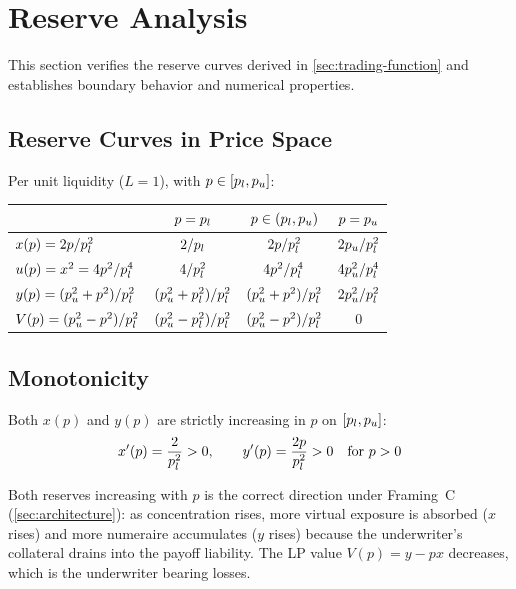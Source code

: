 
\section{Reserve Analysis}\label{sec:reserves}

This section verifies the reserve curves derived in \cref{sec:trading-function}
and establishes boundary behavior and numerical properties.

\subsection{Reserve Curves in Price Space}

Per unit liquidity ($L = 1$), with $p \in [p_l, p_u]$:

\begin{center}
\begin{tabular}{@{}lccc@{}}
\toprule
& $p = p_l$ & $p \in (p_l, p_u)$ & $p = p_u$ \\
\midrule
$x(p) = 2p/p_l^2$ & $2/p_l$ & $2p/p_l^2$ & $2p_u/p_l^2$ \\
$u(p) = x^2 = 4p^2/p_l^4$ & $4/p_l^2$ & $4p^2/p_l^4$ & $4p_u^2/p_l^4$ \\
$y(p) = (p_u^2+p^2)/p_l^2$ & $(p_u^2+p_l^2)/p_l^2$ & $(p_u^2+p^2)/p_l^2$ & $2p_u^2/p_l^2$ \\
$V(p) = (p_u^2-p^2)/p_l^2$ & $(p_u^2-p_l^2)/p_l^2$ & $(p_u^2-p^2)/p_l^2$ & $0$ \\
\bottomrule
\end{tabular}
\end{center}

\subsection{Monotonicity}

\begin{proposition}\label{prop:reserve-monotone}
Both $x(p)$ and $y(p)$ are strictly increasing in $p$ on $[p_l, p_u]$:
\[
  x'(p) = \frac{2}{p_l^2} > 0, \qquad
  y'(p) = \frac{2p}{p_l^2} > 0 \quad\text{for } p > 0
\]
\end{proposition}

\begin{remark}
Both reserves increasing with $p$ is the correct direction under Framing~C
(\cref{sec:architecture}): as concentration rises, more virtual exposure
is absorbed ($x$ rises) and more numeraire accumulates ($y$ rises) because
the underwriter's collateral drains into the payoff liability. The LP value
$V(p) = y - px$ decreases, which is the underwriter bearing losses.
\end{remark}

